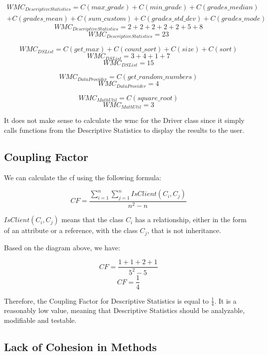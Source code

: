 \documentclass[11pt]{article}
\begin{document}
\begin{equation}
\begin{split}
WMC_{Descriptive Statistics} = C(max\_grade) + C(min\_grade) + C(grades\_median) \\+ C(grades\_mean) + C(sum\_custom) + C(grades\_std\_dev) + C(grades\_mode)
\nonumber
\end{split}
\end{equation}
$$ WMC_{Descriptive Statistics} = 2 + 2 + 2 + 2 + 2 + 5 + 8 $$
$$ WMC_{Descriptive Statistics} = 23 $$

$$ WMC_{DS List} = C(get\_max) + C(count\_sort) + C(size) + C(sort) $$
$$ WMC_{DS List} = 3 + 4 + 1 + 7 $$
$$ WMC_{DS List} = 15 $$

$$ WMC_{Data Provider} =  C(get\_random\_numbers) $$ 
$$ WMC_{Data Provider} = 4 $$

$$ WMC_{Math Util} = C(square\_root) $$ 
$$ WMC_{Math Util} = 3 $$

It does not make sense to calculate the \gls{wmc} for the Driver class since it simply calls functions from the Descriptive Statistics to display the results to the user.

\newpage

\subsection{Coupling Factor}

We can calculate the \gls{cf} using the following formula:

$$ CF = \frac{\sum\limits_{i=1}^{n} \sum\limits_{j=1}^{n} IsClient(C_{i},C_{j})}{n^2-n} $$

$ IsClient(C_{i},C_{j}) $ means that the class $ C_{i} $ has a relationship, either in the form of an attribute or a reference, with the class $ C_{j} $, that is not inheritance.\newline

Based on the diagram above, we have:

$$ CF = \frac{1+1+2+1}{5^2-5} $$
$$ CF = \frac{1}{4} $$

Therefore, the Coupling Factor for Descriptive Statistics is equal to $ \frac{1}{4} $. It is a reasonably low value, meaning that Descriptive Statistics should be analyzable, modifiable and testable. 

\newpage

\subsection{Lack of Cohesion in Methods}
\end{document}

